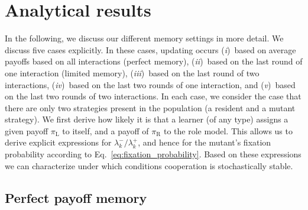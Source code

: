 \documentclass[11pt]{article}
\def\rolemodel{\text{R}}
\def\learner{\text{L}}
\theoremstyle{plainCl1}
\theoremstyle{plainCl2}
\begin{document}
\newpage


\section{Analytical results}
\label{section:analyticalresults}


In the following, we discuss our different memory settings in more detail. 
We discuss five cases explicitly. In these cases, updating occurs
({\it i})~based on average payoffs based on all interactions (perfect memory), 
({\it ii})~based on the last round of one interaction (limited memory), 
({\it iii})~based on the last round of two interactions,
({\it iv})~based on the last two rounds of one interaction, and 
({\it v})~based on the last two rounds of two interactions. 
In each case, we consider the case that there are only two strategies present in the population (a resident and a mutant strategy). 
We first derive how likely it is that a learner (of any type) assigns a given payoff $\pi_\learner$ to itself, and a payoff of $\pi_\rolemodel$ to the role model. 
This allows us to derive explicit expressions for $\lambda^-_k/\lambda^+_k$, and hence for the mutant's fixation probability according to Eq.~\eqref{eq:fixation_probability}.
Based on these expressions we can characterize under which conditions cooperation is stochastically stable.  



\subsection{Perfect payoff memory}\label{section:perfect_memory}

\end{document}
